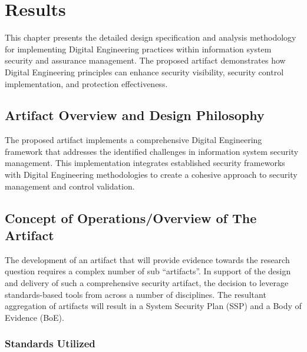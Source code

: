 \chapter{\leavevmode\newline Results}\label{chap:Chapter_4}

This chapter presents the detailed design specification and analysis methodology for implementing Digital Engineering practices within information system security and assurance management. The proposed artifact demonstrates how Digital Engineering principles can enhance security visibility, security control implementation, and protection effectiveness.

\section{Artifact Overview and Design Philosophy}

The proposed artifact implements a comprehensive Digital Engineering framework that addresses the identified challenges in information system security management. This implementation integrates established security frameworks with Digital Engineering methodologies to create a cohesive approach to security management and control validation.

\section{Concept of Operations/Overview of The Artifact}

The development of an artifact that will provide evidence towards the research question requires a complex number of sub ``artifacts''. In support of the design and delivery of such a comprehensive security artifact, the decision to leverage standards-based tools from across a number of disciplines. The resultant aggregation of artifacts will result in a System Security Plan (SSP) and a Body of Evidence (BoE). 

\subsection{Standards Utilized}

